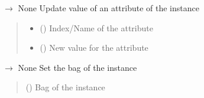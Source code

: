\documentclass[letterpaper,10pt,english]{sphinxmanual}
\begin{document}
\begin{fulllineitems}
\begin{fulllineitems}
\label{\detokenize{data/_autosummary/miml.data.instance.Instance:miml.data.instance.Instance.set_attribute}}
\pysigstartsignatures
\pysiglinewithargsret
{}
{\sphinxparamcomma {}}
{{ $\rightarrow$ None}}
\pysigstopsignatures
\sphinxAtStartPar
Update value of an attribute of the instance
\begin{quote}\begin{description}
\begin{itemize}
\item {} 
\sphinxAtStartPar
{} () \textendash{} Index/Name of the attribute

\item {} 
\sphinxAtStartPar
{} () \textendash{} New value for the attribute

\end{itemize}

\end{description}\end{quote}

\end{fulllineitems}


\begin{fulllineitems}
\label{\detokenize{data/_autosummary/miml.data.instance.Instance:miml.data.instance.Instance.set_bag}}
\pysigstartsignatures
\pysiglinewithargsret
{}
{}
{{ $\rightarrow$ None}}
\pysigstopsignatures
\sphinxAtStartPar
Set the bag of the instance
\begin{quote}\begin{description}
\sphinxAtStartPar
{} ({\hyperref[\detokenize{data/_autosummary/miml.data.bag.Bag:miml.data.bag.Bag}]{}}) \textendash{} Bag of the instance

\end{description}\end{quote}


\end{fulllineitems}
\end{fulllineitems}
\end{document}
